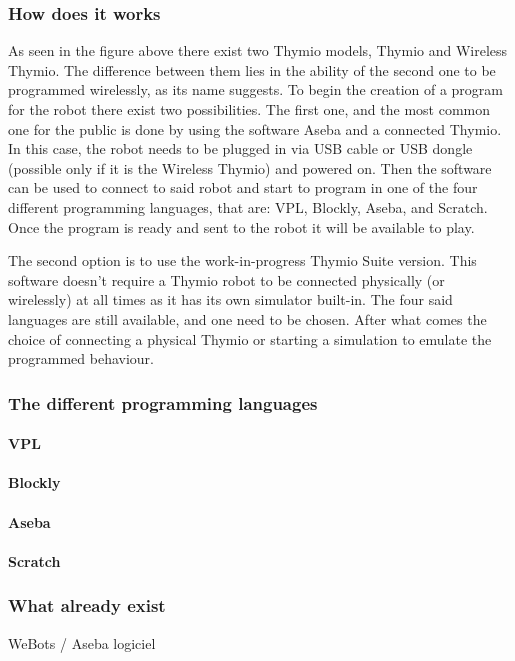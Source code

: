 \documentclass{scrartcl}
\begin{document}
\subsubsection{How does it works}

As seen in the figure above there exist two Thymio models, Thymio and Wireless Thymio. 
The difference between them lies in the ability of the second one to be programmed wirelessly, 
as its name suggests. To begin the creation of a program for the robot there exist two possibilities.
The first one, and the most common one for the public is done by using the software Aseba and a connected Thymio. 
In this case, the robot needs to be plugged in via USB cable or USB dongle (possible only if it is the Wireless Thymio) and powered on. 
Then the software can be used to connect to said robot and start to program in one of the four different programming languages, 
that are: VPL, Blockly, Aseba, and Scratch. Once the program is ready and sent to the robot it will be available to play.

The second option is to use the work-in-progress Thymio Suite version. 
This software doesn’t require a Thymio robot to be connected physically (or wirelessly) at all times as it has its own simulator built-in. 
The four said languages are still available, and one need to be chosen. 
After what comes the choice of connecting a physical Thymio or starting a simulation to emulate the programmed behaviour.

\subsubsection{The different programming languages}
\paragraph{VPL}
\paragraph{Blockly}
\paragraph{Aseba}
\paragraph{Scratch}
\subsubsection{What already exist} 
WeBots / Aseba logiciel
\end{document}
